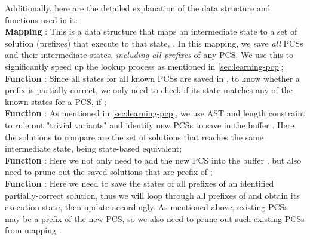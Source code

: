Additionally, here are the detailed explanation of the data structure and functions used in it: \\
 \textbf{Mapping }: This is a data structure that maps an intermediate state to a set of solution (prefixes) that execute to that state, \ie . In this mapping, we save \emph{all} PCSs and their intermediate states, \textit{including all prefixes} of any PCS. We use this to significantly speed up the lookup process as mentioned in \autoref{sec:learning-pcp}; \\
 \textbf{Function }: Since all states for all known PCSs are saved in , to know whether a prefix  is partially-correct, we only need to check if its state matches any of the known states for a PCS, \ie if ; \\
 \textbf{Function }: As mentioned in \autoref{sec:learning-pcp}, we use AST and length constraint to rule out "trivial variants" and identify new PCSs to save in the buffer . Here the solutions to compare are the set of solutions  that reaches the same intermediate state, \ie being state-based equivalent;\\
 \textbf{Function }: Here we not only need to add the new PCS into the buffer , but also need to prune out the saved solutions that are prefix of ; \\
 \textbf{Function }: Here we need to save the states of all prefixes of an identified partially-correct solution, thus we will loop through all prefixes of  and obtain its execution state, then update  accordingly. As mentioned above, existing PCSs may be a prefix of the new PCS, so we also need to prune out such existing PCSs from mapping .

